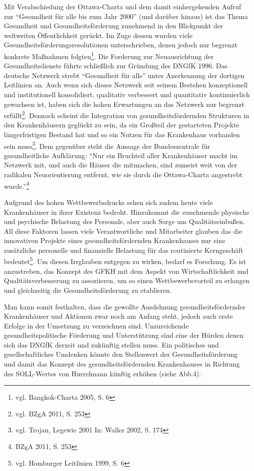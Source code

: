 Mit Verabschiedung der Ottawa-Charta und dem damit einhergehenden Aufruf zur "`Gesundheit für alle bis zum Jahr 2000"' (und darüber hinaus) ist das Thema Gesundheit und Gesundheitsförderung zunehmend in den Blickpunkt der weltweiten Öffentlichkeit gerückt. Im Zuge dessen wurden viele Gesundheitsförderungsresolutionen unterschrieben, denen jedoch nur begrenzt konkrete Maßnahmen folgten\footnote{vgl. Bangkok-Charta 2005, S. 6}. Die Forderung zur Neuausrichtung der Gesundheitsdienste führte schließlich zur Gründung des DNGfK 1996. Das deutsche Netzwerk strebt "`Gesundheit für alle"' unter Anerkennung der dortigen Leitlinien an. Auch wenn sich dieses Netzwerk seit seinem Bestehen konzeptionell und institutionell konsolidiert, qualitativ verbessert und quantitativ kontinuierlich gewachsen ist, haben sich die hohen Erwartungen an das Netzwerk nur begrenzt erfüllt\footnote{vgl. BZgA 2011, S. 253}. Dennoch scheint die Integration von gesundheitsfördernden Strukturen in den Krankenhäusern geglückt zu sein, da ein Großteil der gestarteten Projekte längerfristigen Bestand hat und so ein Nutzen für das Krankenhaus vorhanden sein muss\footnote{vgl. Trojan, Legewie 2001 In: Waller 2002, S. 174}. Dem gegenüber steht die Aussage der Bundeszentrale für gesundheitliche Aufklärung: "`Nur ein Bruchteil aller Krankenhäuser macht im Netzwerk mit, und auch die Häuser die mitmachen, sind zumeist weit von der radikalen Neuorientierung entfernt, wie sie durch die Ottawa-Charta angestrebt wurde."'\footnote{BZgA 2011, S. 253}

Aufgrund des hohen Wettbewerbsdrucks sehen sich zudem heute viele Krankenhäuser in ihrer Existenz bedroht. Hinzukommt die zunehmende physische und psychische Belastung des Personals, aber auch Sorge um Qualitätseinbußen. All diese Faktoren lassen viele Verantwortliche und Mitarbeiter glauben das die innovativen Projekte eines gesundheitsfördernden Krankenhauses nur eine zusätzliche personelle und finanzielle Belastung für das routinierte Kerngeschäft bedeutet\footnote{vgl. Homburger Leitlinien 1999, S. 6}. Um diesen Irrglauben entgegen zu wirken, bedarf es Forschung. Es ist anzustreben, das Konzept des GFKH mit dem Aspekt von Wirtschaftlichkeit und Qualitätsverbesserung zu assoziieren, um so einen Wettbewerbsvorteil zu erlangen und gleichzeitig die Gesundheitsförderung zu etablieren.

Man kann somit festhalten, dass die gewollte Ausdehnung gesundheitsfördernder Krankenhäuser und Aktionen zwar noch am Anfang steht, jedoch auch erste Erfolge in der Umsetzung zu verzeichnen sind. Unzureichende gesundheitspolitische Förderung und Unterstützung sind eine der Hürden denen sich das DNGfK derzeit und zukünftig stellen muss. Ein politisches und gesellschaftliches Umdenken könnte den Stellenwert der Gesundheitsförderung und damit das Konzept des gesundheitsfördernden Krankenhauses in Richtung des SOLL-Wertes von Hurrelmann künftig erhöhen (siehe Abb.4).


